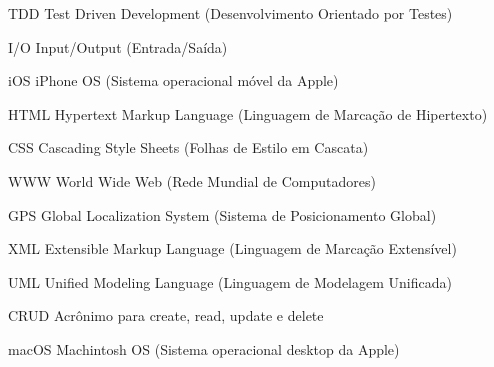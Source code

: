 \begin{siglas}
	\item[TDD] Test Driven Development (Desenvolvimento Orientado por Testes)
	\item[I/O] Input/Output (Entrada/Saída)
	\item[iOS] iPhone OS (Sistema operacional móvel da Apple)
	\item[HTML] Hypertext Markup Language (Linguagem de Marcação de Hipertexto)
	\item[CSS] Cascading Style Sheets (Folhas de Estilo em Cascata)
	\item[WWW] World Wide Web (Rede Mundial de Computadores)
	\item[GPS] Global Localization System (Sistema de Posicionamento Global)
	\item[XML] Extensible Markup Language (Linguagem de Marcação Extensível)
	\item[UML] Unified Modeling Language (Linguagem de Modelagem Unificada)
	\item[CRUD] Acrônimo para create, read, update e delete
	\item[macOS] Machintosh OS (Sistema operacional desktop da Apple)
\end{siglas}